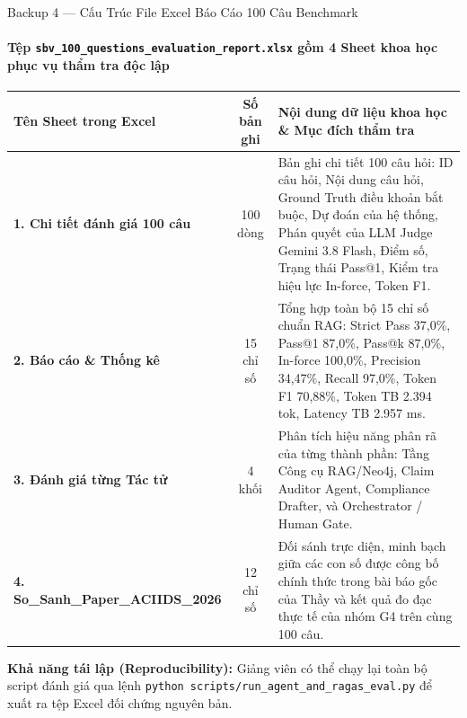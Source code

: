 \documentclass[aspectratio=169,10pt,xcolor={table}]{beamer}
\begin{document}
\begin{frame}{Backup 4 --- Cấu Trúc File Excel Báo Cáo 100 Câu Benchmark}
\framesubtitle{Tệp \texttt{sbv\_100\_questions\_evaluation\_report.xlsx} gồm 4 Sheet khoa học phục vụ thẩm tra độc lập}
\centering
\scriptsize
\begin{tabularx}{0.98\linewidth}{@{}p{3.8cm} c X@{}}
\toprule
\textbf{Tên Sheet trong Excel} & \textbf{Số bản ghi} & \textbf{Nội dung dữ liệu khoa học \& Mục đích thẩm tra} \\ \midrule
\textbf{1. Chi tiết đánh giá 100 câu} & 100 dòng & Bản ghi chi tiết 100 câu hỏi: ID câu hỏi, Nội dung câu hỏi, Ground Truth điều khoản bắt buộc, Dự đoán của hệ thống, Phán quyết của LLM Judge Gemini 3.8 Flash, Điểm số, Trạng thái Pass@1, Kiểm tra hiệu lực In-force, Token F1. \\
\textbf{2. Báo cáo \& Thống kê} & 15 chỉ số & Tổng hợp toàn bộ 15 chỉ số chuẩn RAG: Strict Pass 37,0\%, Pass@1 87,0\%, Pass@k 87,0\%, In-force 100,0\%, Precision 34,47\%, Recall 97,0\%, Token F1 70,88\%, Token TB 2.394 tok, Latency TB 2.957 ms. \\
\textbf{3. Đánh giá từng Tác tử} & 4 khối & Phân tích hiệu năng phân rã của từng thành phần: Tầng Công cụ RAG/Neo4j, Claim Auditor Agent, Compliance Drafter, và Orchestrator / Human Gate. \\
\textbf{4. So\_Sanh\_Paper\_ACIIDS\_2026} & 12 chỉ số & Đối sánh trực diện, minh bạch giữa các con số được công bố chính thức trong bài báo gốc của Thầy và kết quả đo đạc thực tế của nhóm G4 trên cùng 100 câu. \\
\bottomrule
\end{tabularx}
\vskip0.15cm
\begin{tcolorbox}[colback=codebg,colframe=hcmutblue!50,boxrule=0.5pt,top=2pt,bottom=2pt,left=4pt,right=4pt]
\scriptsize\textbf{Khả năng tái lập (Reproducibility):} Giảng viên có thể chạy lại toàn bộ script đánh giá qua lệnh \texttt{python scripts/run\_agent\_and\_ragas\_eval.py} để xuất ra tệp Excel đối chứng nguyên bản.
\end{tcolorbox}
\end{frame}
\end{document}
